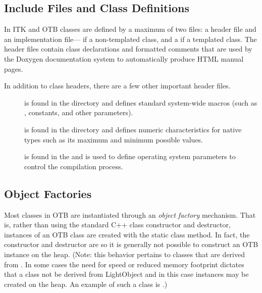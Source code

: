 \subsection{Include Files and Class Definitions}
\label{sec:IncludeFiles}

In ITK and OTB classes are defined by a maximum of two files: a header  file
and an implementation file--- if a non-templated class, and a
 if a templated class.
The header files contain class declarations
and formatted comments that are used by the Doxygen documentation
system to automatically produce HTML manual pages.

In addition to class headers, there are a few other important header files.
\begin{description}
        \item[] is found in the
         directory
        and defines standard system-wide macros (such as ,
        constants, and other parameters).

        \item[] is found in the 
        directory and defines numeric characteristics for native types such
        as its maximum and minimum possible values.

        \item[] is found in the 
        and is used to define operating system parameters to control
        the compilation process.
\end{description}

\subsection{Object Factories}
\label{sec:ObjectFactories}


Most classes in OTB are instantiated through an \emph{object factory}
mechanism. That is, rather than using the standard C++ class constructor and
destructor, instances of an OTB class are created with the static class
 method. In fact, the constructor and destructor are
 so it is generally not possible to construct an OTB
instance on the heap. (Note: this behavior pertains to classes that are
derived from . In some cases the need for speed or
reduced memory footprint dictates that a class not be derived from
LightObject and in this case instances may be created on the heap. An
example of such a class is .)

